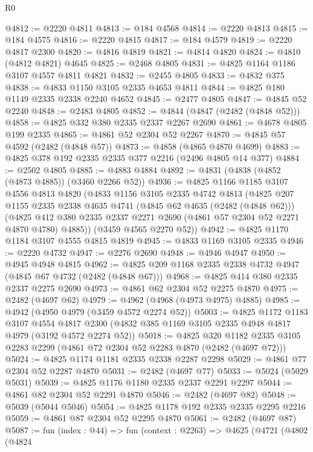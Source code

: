\begin{lexlean}{R0}
\begin{coremodule}
@4812 := @2220 @4811
@4813 := @184 @4568
@4814 := @2220 @4813
@4815 := @184 @4575
@4816 := @2220 @4815
@4817 := @184 @4579
@4819 := @2220 @4817 @2300
@4820 := @4816 @4819
@4821 := @4814 @4820
@4824 := @4810 (@4812 @4821) @4645
@4825 := @2468 @4805
@4831 := @4825 @1164 @1186 @3107 @4557 @4811 @4821
@4832 := @2455 @4805
@4833 := @4832 @375
@4838 := @4833 @1150 @3105 @2335 @4653 @4811
@4844 := @4825 @180 @1149 @2335 @2338 @2240 @4652
@4845 := @2477 @4805
@4847 := @4845 @52 @2240
@4848 := @2483 @4805
@4852 := @4844 (@4847 (@2482 (@4848 @52)))
@4858 := @4825 @332 @380 @2335 @2337 @2267 @2690
@4861 := @4678 @4805 @199 @2335
@4865 := @4861 @52 @2304 @52 @2267
@4870 := @4845 @57 @4592 (@2482 (@4848 @57))
@4873 := @4858 (@4865 @4870 @4699)
@4883 := @4825 @378 @192 @2335 @2335 @377 @2216 (@2496 @4805 @14 @377)
@4884 := @2502 @4805
@4885 := @4883 @4884
@4892 := @4831 (@4838 (@4852 (@4873 @4885)) (@3460 @2266 @52))
@4936 := @4825
    @1166
    @1185
    @3107
    @4556
    @4813
    @4820
    (@4833
      @1156
      @3105
      @2335
      @4742
      @4813
      (@4825
        @207
        @1155
        @2335
        @2338
        @4635
        @4741
        (@4845 @62 @4635 (@2482 (@4848 @62)))
        (@4825 @412 @380 @2335 @2337 @2271 @2690 (@4861 @57 @2304 @52 @2271 @4870 @4780) @4885))
      (@3459 @4565 @2270 @52))
@4942 := @4825 @1170 @1184 @3107 @4555 @4815 @4819
@4945 := @4833 @1169 @3105 @2335
@4946 := @2220 @4732
@4947 := @2276 @2690
@4948 := @4946 @4947
@4950 := @4945 @4948 @4815
@4962 := @4825 @209 @1168 @2335 @2338 @4732 @4947 (@4845 @67 @4732 (@2482 (@4848 @67)))
@4968 := @4825 @414 @380 @2335 @2337 @2275 @2690
@4973 := @4861 @62 @2304 @52 @2275 @4870
@4975 := @2482 (@4697 @62)
@4979 := @4962 (@4968 (@4973 @4975) @4885)
@4985 := @4942 (@4950 @4979 (@3459 @4572 @2274 @52))
@5003 := @4825
    @1172
    @1183
    @3107
    @4554
    @4817
    @2300
    (@4832 @385 @1169 @3105 @2335 @4948 @4817 @4979 (@3192 @4572 @2274 @52))
@5018 := @4825
    @320
    @1182
    @2335
    @3105
    @2283
    @2299
    (@4861 @72 @2304 @52 @2283 @4870 (@2482 (@4697 @72)))
@5024 := @4825 @1174 @1181 @2335 @2338 @2287 @2298
@5029 := @4861 @77 @2304 @52 @2287 @4870
@5031 := @2482 (@4697 @77)
@5033 := @5024 (@5029 @5031)
@5039 := @4825 @1176 @1180 @2335 @2337 @2291 @2297
@5044 := @4861 @82 @2304 @52 @2291 @4870
@5046 := @2482 (@4697 @82)
@5048 := @5039 (@5044 @5046)
@5054 := @4825 @1178 @192 @2335 @2335 @2295 @2216
@5059 := @4861 @87 @2304 @52 @2295 @4870
@5061 := @2482 (@4697 @87)
@5087 := fun (index : @44) =>
  fun (context : @2263) =>
  @4625
    (@4721
      (@4802
        (@4824

\end{coremodule}
\end{lexlean}
